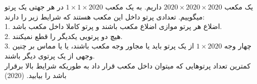 یک مکعب $2020 \times 2020 \times 2020$ داریم. به یک مکعب $1 \times 1 \times 2020$ در هر جهتی
یک پرتو میگوییم.
تعدادی پرتو داخل این مکعب هستند که شرایط زیر را دارند: \\
1. اضلاع هر پرتو موازی اضلاع مکعب باشند و پرتو کاملا داخل مکعب باشد. \\
2. هیچ دو پرتویی یکدیگر را قطع نمیکنند. \\
3. چهار وجه $1 \times 2020$ از یک پرتو باید یا مجاور وجه مکعب باشند، یا یا مماس بر چنین وجهی از یک پرتوی دیگر باشند. \\
کمترین تعداد پرتوهایی که میتوان داخل مکعب قرار داد به طوریکه شرایط بالا برقرار باشد را بیابید.
(2020)